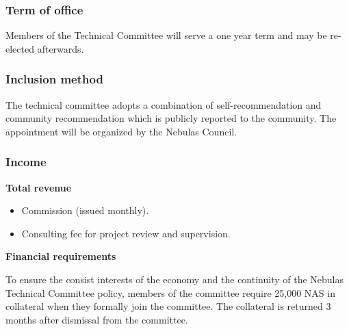 \subsubsection{Term of office}

Members of the Technical Committee will serve a one year term and may be re-elected afterwards.

\subsubsection{Inclusion method}

The technical committee adopts a combination of self-recommendation and community recommendation which is publicly reported to the community. The appointment will be organized by the Nebulas Council.


\subsubsection{Income}

\textbf{Total revenue}

\begin{itemize}
	\item Commission (issued monthly).
	\item Consulting fee for project review and supervision.
\end{itemize}

\vspace{2em}

\textbf{Financial requirements}

To ensure the consist interests of the economy and the continuity of the Nebulas Technical Committee policy, members of the committee require 25,000 NAS in collateral when they formally join the committee. The collateral is returned 3 months after dismissal from the committee.
